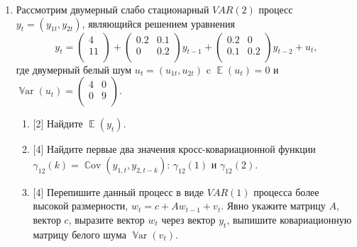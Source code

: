 \documentclass[12pt]{article}
\DeclareMathOperator{\Cov}{\mathbb{C}ov}
\DeclareMathOperator{\Var}{\mathbb{V}ar}
\DeclareMathOperator{\E}{\mathbb{E}}
\begin{document}
\begin{enumerate}
    \item Рассмотрим двумерный слабо стационарный $VAR(2)$ процесс $y_t = (y_{1t}, y_{2t})$, являющийся решением уравнения
    \[
    y_t = \begin{pmatrix}
    4 \\ 
    11 \\    
    \end{pmatrix} + 
    \begin{pmatrix}
      0.2  & 0.1 \\
      0  & 0.2 \\
    \end{pmatrix} y_{t-1} + 
    \begin{pmatrix}
      0.2  & 0 \\
      0.1  & 0.2 \\
    \end{pmatrix} y_{t-2} + u_t,
    \]
    где двумерный белый шум $u_t = (u_{1t}, u_{2t})$ c $\E(u_t) = 0$ и $\Var(u_t) = \begin{pmatrix}
        4 & 0 \\
        0 & 9 \\
    \end{pmatrix}$.
    \begin{enumerate}
        \item {[2]} Найдите $\E(y_t)$.
        \item {[4]} Найдите первые два значения кросс-ковариационной функции $\gamma_{12}(k) = \Cov(y_{1,t}, y_{2, t-k})$: $\gamma_{12}(1)$ и $\gamma_{12}(2)$.
        \item {[4]} Перепишите данный процесс в виде $VAR(1)$ процесса более высокой размерности, $w_t = c + A w_{t-1} + v_t$.
        Явно укажите матрицу $A$, вектор $c$, выразите вектор $w_t$ через вектор $y_t$, выпишите ковариационную матрицу белого шума $\Var(v_t)$.
    \end{enumerate}

\end{enumerate}
\end{document}
